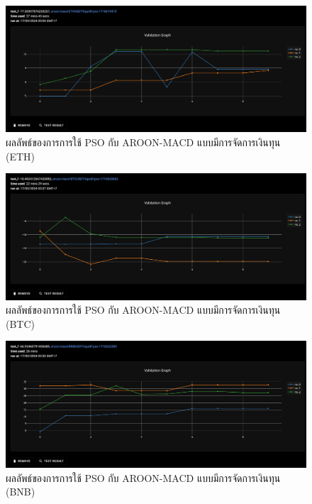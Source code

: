 \begin{figure}[ht]
    \centering
    \includegraphics[width=\textwidth]{images/pso/aroon-macd/eth-liquid.png}
    \caption{ผลลัพธ์ของการการใช้ PSO กับ AROON-MACD แบบมีการจัดการเงินทุน (ETH)}
\end{figure}
\begin{figure}[ht]
    \centering
    \includegraphics[width=\textwidth]{images/pso/aroon-macd/btc-liquid.png}
    \caption{ผลลัพธ์ของการการใช้ PSO กับ AROON-MACD แบบมีการจัดการเงินทุน (BTC)}
\end{figure}
\begin{figure}[ht]
    \centering
    \includegraphics[width=\textwidth]{images/pso/aroon-macd/bnb-liquid.png}
    \caption{ผลลัพธ์ของการการใช้ PSO กับ AROON-MACD แบบมีการจัดการเงินทุน (BNB)}
\end{figure}
